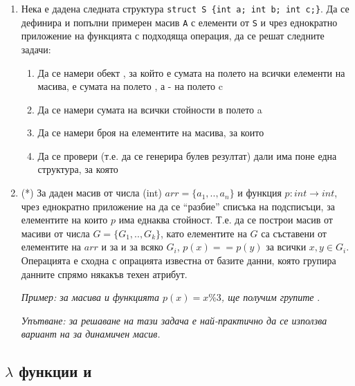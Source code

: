\begin{enumerate}[]
\begin{mdframed}[hidealllines=true,backgroundcolor=gray!20]
\begin{lstlisting}
  template <typename ElemT,ResultT>
  ResultT reduce(ElemtT arr[], unisgned size, OpFn, ResultT null_val);
  \end{lstlisting}

\end{mdframed}

  \item Нека е дадена следната структура \texttt{struct S \{int a; int b; int c;\}}. Да се дефинира и попълни примерен масив \texttt{A} с елементи от  \texttt{S} и чрез еднократно приложение на функцията  с подходяща операция, да се решат следните задачи:
  
  \begin{enumerate}[label=\alph*)]
    \item Да се намери обект , за който  е сумата на полето  на всички елементи на масива,  е сумата на полето , а  - на полето c
    \item Да се намери сумата на всички стойности в полето a
    \item Да се намери броя на елементите на масива, за които 
    \item Да се провери (т.е. да се генерира булев резултат) дали има поне една структура, за която 
  \end{enumerate}

  \item(*) За даден масив от числа (int) $arr=\{a_1,..,a_n\}$ и функция $p:int \rightarrow int$, чрез еднократно приложение на  да се ``разбие'' списъка  на подсписъци, за елементите на които $p$ има еднаква стойност. Т.е. да се построи масив от масиви от числа $G=\{G_1,..,G_k\}$, като елементите на $G$ са съставени от елементите на $arr$ и  за и за всяко $G_i$, $p(x)==p(y)$ за всички $x,y \in G_i$. Операцията е сходна с опрацията  известна от базите данни, която групира данните спрямо някакъв техен атрибут.
  
  \emph{Пример: за масива  и функцията $p(x)=x\%3$, ще получим групите }.

  \emph{Упътване: за решаване на тази задача е най-практично да се използва вариант на  за динамичен масив.}


\end{enumerate}

\subsection{$\lambda$ функции и }

